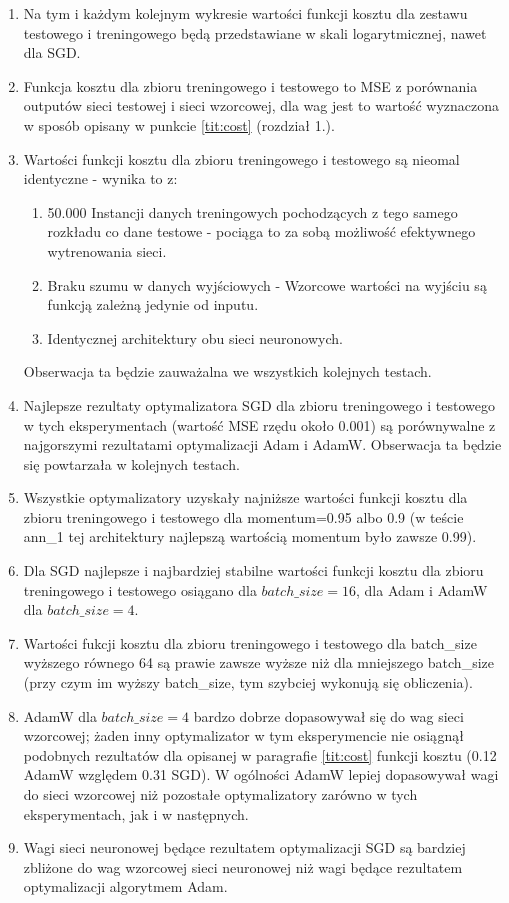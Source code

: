 \documentclass[12pt]{article}
\begin{document}
\begin{enumerate}
	\item Na tym i każdym kolejnym wykresie wartości funkcji kosztu dla zestawu testowego i treningowego będą przedstawiane w skali logarytmicznej, nawet dla SGD.
	\item Funkcja kosztu dla zbioru treningowego i testowego to MSE z porównania outputów sieci testowej i sieci wzorcowej, dla wag jest to wartość wyznaczona w sposób opisany w punkcie \ref{tit:cost} (rozdział 1.).
	\item Wartości funkcji kosztu dla zbioru treningowego i testowego są nieomal identyczne - wynika to z:
	\begin{enumerate}
		\item 50.000 Instancji danych treningowych pochodzących z tego samego rozkładu co dane testowe - pociąga to za sobą możliwość efektywnego wytrenowania sieci.
		\item Braku szumu w danych wyjściowych - Wzorcowe wartości na wyjściu są funkcją zależną jedynie od inputu.
		\item Identycznej architektury obu sieci neuronowych.
	\end{enumerate}
	Obserwacja ta będzie zauważalna we wszystkich kolejnych testach.
	\item Najlepsze rezultaty optymalizatora SGD dla zbioru treningowego i testowego w tych eksperymentach (wartość MSE rzędu około 0.001) są porównywalne z najgorszymi rezultatami optymalizacji Adam i AdamW. Obserwacja ta będzie się powtarzała w kolejnych testach.
	\item Wszystkie optymalizatory uzyskały najniższe wartości funkcji kosztu dla zbioru treningowego i testowego dla momentum=0.95 albo 0.9 (w teście ann\_1 tej architektury najlepszą wartością momentum było zawsze 0.99).
	\item Dla SGD najlepsze i najbardziej stabilne wartości funkcji kosztu dla zbioru treningowego i testowego osiągano dla $batch\_size=16$, dla Adam i AdamW dla $batch\_size=4$.
	\item Wartości fukcji kosztu dla zbioru treningowego i testowego dla batch\_size wyższego równego 64 są prawie zawsze wyższe niż dla mniejszego batch\_size (przy czym im wyższy batch\_size, tym szybciej wykonują się obliczenia).
	\item AdamW dla $batch\_size=4$ bardzo dobrze dopasowywał się do wag sieci wzorcowej; żaden inny optymalizator w tym eksperymencie nie osiągnął podobnych rezultatów dla opisanej w paragrafie \ref{tit:cost} funkcji kosztu (0.12 AdamW względem 0.31 SGD). W ogólności AdamW lepiej dopasowywał wagi do sieci wzorcowej niż pozostałe optymalizatory zarówno w tych eksperymentach, jak i w następnych.
	\item Wagi sieci neuronowej będące rezultatem optymalizacji SGD są bardziej zbliżone do wag wzorcowej sieci neuronowej niż wagi będące rezultatem optymalizacji algorytmem Adam.
\end{enumerate}
\end{document}
